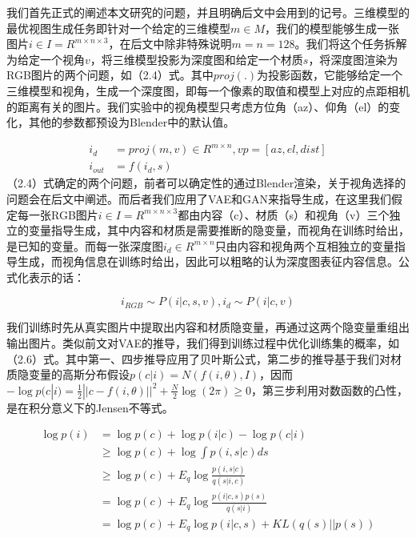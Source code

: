 \documentclass[UTF8,openany,AutoFakeBold,AutoFakeSlant,cs4size]{ctexbook}
\begin{document}
我们首先正式的阐述本文研究的问题，并且明确后文中会用到的记号。三维模型的最优视图生成任务即针对一个给定的三维模型$m \in M$，我们的模型能够生成一张图片$i \in I = R^{m \times n \times 3}$，在后文中除非特殊说明$m = n = 128$。我们将这个任务拆解为给定一个视角$v$，将三维模型投影为深度图和给定一个材质$s$，将深度图渲染为RGB图片的两个问题，如（2.4）式。其中$proj(.)$为投影函数，它能够给定一个三维模型和视角，生成一个深度图，即每一个像素的取值和模型上对应的点距相机的距离有关的图片。我们实验中的视角模型只考虑方位角（az）、仰角（el）的变化，其他的参数都预设为Blender中的默认值。

\begin{equation}
	\begin{aligned}
		i_{d} &= proj(m, v) \in R^{m \times n}, vp = [az, el, dist] \\
		i_{out} &= f(i_{d}, s)
	\end{aligned}
\end{equation}
（2.4）式确定的两个问题，前者可以确定性的通过Blender渲染，关于视角选择的问题会在后文中阐述。而后者我们应用了VAE和GAN来指导生成，在这里我们假定每一张RGB图片$i \in I = R^{m \times n \times 3}$都由内容（c）、材质（s）和视角（v）三个独立的变量指导生成，其中内容和材质是需要推断的隐变量，而视角在训练时给出，是已知的变量。而每一张深度图$i_{d} \in R^{m \times n}$只由内容和视角两个互相独立的变量指导生成，而视角信息在训练时给出，因此可以粗略的认为深度图表征内容信息。公式化表示的话：

\begin{equation}
	i_{RGB} \sim P(i | c, s, v), i_{d} \sim P(i | c, v)
\end{equation}

我们训练时先从真实图片中提取出内容和材质隐变量，再通过这两个隐变量重组出输出图片。类似前文对VAE的推导，我们得到训练过程中优化训练集的概率，如（2.6）式。其中第一、四步推导应用了贝叶斯公式，第二步的推导基于我们对材质隐变量的高斯分布假设$p(c | i) = N(f(i, \theta), I)$，因而$-\log p(c | i) = \frac{1}{2}||c - f(i, \theta) ||^2 + \frac{N}{2}\log (2\pi) \geq 0$，第三步利用对数函数的凸性，是在积分意义下的Jensen不等式。

\begin{equation}
	\begin{aligned}
		\log p(i) &= \log p(c) + \log p(i | c) - \log p(c | i) \\
		&\geq \log p(c) + \log  \int p(i, s | c) ds \\
		&\geq \log p(c) + E_{q} \log \frac{p(i, s | c)}{q(s | i, c)} \\
		&= \log p(c) + E_{q} \log \frac{p(i | c, s)p(s)}{q(s | i)} \\
		&= \log p(c) + E_{q} \log p(i | c, s) + KL(q(s) || p(s)) \\
	\end{aligned}
\end{equation}
\end{document}
